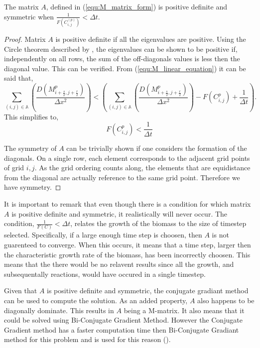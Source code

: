 \begin{prop}
  The matrix $A$, defined in (\ref{equ:M_matrix_form}) is positive definite and symmetric when $\frac{1}{ F(C^{(p)}_{i,j}) } < \Delta t$.
\end{prop}
\begin{proof}
  Matrix $A$ is positive definite if all the eigenvalues are positive. 
  Using the Circle theorem described by \cite{gerschgorin1931uber_die_abgrenzung}, the eigenvalues can be shown to be positive if, independently on all rows, the sum of the off-diagonals values is less then the diagonal value.
  This can be verified. From (\ref{equ:M_linear_equation}) it can be said that,
  \begin{equation}
    \sum_{(i,j) \in \mathbb{A}} \left( \frac{D( M^{p}_{i+\frac{s}{2}, j+\frac{r}{2}} )}{\Delta x^2} \right)
     < \left( \sum_{(i,j) \in \mathbb{A}} \left( \frac{D( M^{p}_{i+\frac{s}{2}, j+\frac{r}{2}} )}{\Delta x^2} \right) 
    - F(C^{p}_{i,j}) + \frac{1}{\Delta t} \right). 
  \end{equation}
  This simplifies to,
  \begin{equation}
    F(C^{p}_{i,j}) < \frac{1}{\Delta t}
  \end{equation}

  The symmetry of $A$ can be trivially shown if one considers the formation of the diagonals.
  On a single row, each element corresponds to the adjacent grid points of grid $i,j$.
  As the grid ordering counts along, the elements that are equidistance from the diagonal are actually reference to the same grid point. 
  Therefore we have symmetry. 
\end{proof} 

It is important to remark that even though there is a condition for which matrix $A$ is positive definite and symmetric, it realistically will never occur.
The condition, $\frac{1}{F(C)} < \Delta t$, relates the growth of the biomass to the size of timestep selected.
Specifically, if a large enough time step is choosen, then $A$ is not guarenteed to converge.
When this occurs, it means that a time step, larger then the characteristic growth rate of the biomass, has been incorrectly choosen.
This means that the there would be no relavent results since all the growth, and subsequentally reactions, would have occured in a single timestep.

Given that $A$ is positive definite and symmetric, the conjugate gradiant method can be used to compute the solution.
As an added property, $A$ also happens to be diagonally dominate.
This results in $A$ being a M-matrix.
It also means that it could be solved using Bi-Conjugate Gradient Method.
However the Conjugate Gradient method has a faster computation time then Bi-Conjugate Gradiant method for this problem and is used for this reason (\cite{barret1987templates}).

